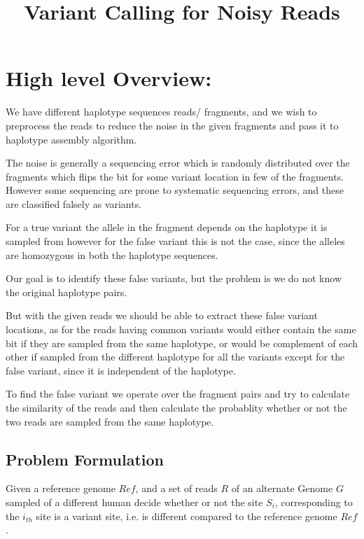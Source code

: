 \documentclass[9pt]{osa-supplemental-document}
\title{Variant Calling for Noisy Reads}
\author{} %
\begin{document}
\maketitle


\section{High level Overview:}

We have different haplotype sequences reads/ fragments, and we wish to preprocess the reads to reduce the noise in the given fragments and pass it to haplotype assembly algorithm. 

The noise is generally a sequencing error which is randomly distributed over the fragments which flips the bit for some variant location in few of the fragments. However some sequencing are prone to systematic sequencing errors, and these are classified falsely as variants. 

For a true variant the allele in the fragment depends on the haplotype it is sampled from however for the false variant this is not the case, since the alleles are homozygous in both the haplotype sequences.

Our goal is to identify these false variants, but the problem is we do not know the original haplotype pairs. 


But with the given reads we should be able to extract these false variant locations, as for the reads having common variants would either contain the same bit if they are sampled from the same haplotype, or would be complement of each other if sampled from the different haplotype for all the variants except for the false variant, since it is independent of the haplotype.

To find the false variant we operate over the fragment pairs and try to calculate the similarity of the reads and then calculate the probablity whether or not the two reads are sampled from the same haplotype. 

\subsection{Problem Formulation}
Given a reference genome $Ref$, and a set of reads $R$ of an alternate Genome $G$ sampled of a different human decide whether or not the site $S_i$, corresponding to the $i_{th}$ site is a variant site, i.e. is different compared to the reference genome $Ref$.
\end{document}
